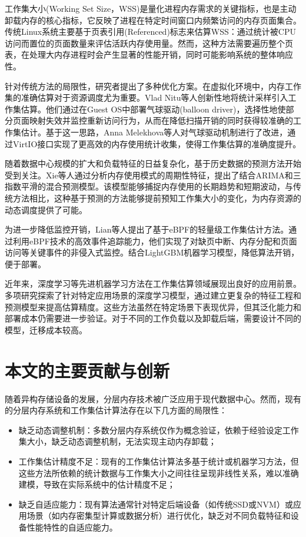 工作集大小(Working Set Size，WSS)是量化进程内存需求的关键指标，也是主动卸载内存的核心指标，它反映了进程在特定时间窗口内频繁访问的内存页面集合。传统Linux系统主要基于页表引用(Referenced)标志来估算WSS：通过统计被CPU访问而置位的页面数量来评估活跃内存使用量。然而，这种方法需要遍历整个页表，在处理大内存进程时会产生显著的性能开销，同时可能影响系统的整体响应性。

针对传统方法的局限性，研究者提出了多种优化方案。在虚拟化环境中，内存工作集的准确估算对于资源调度尤为重要。Vlad Nitu等人创新性地将统计采样引入工作集估算。他们通过在Guest OS中部署气球驱动(balloon driver)，选择性地使部分页面映射失效并监控重新访问行为，从而在降低扫描开销的同时获得较准确的工作集估计。基于这一思路，Anna Melekhova等人对气球驱动机制进行了改进，通过VirtIO接口实现了更高效的内存使用统计收集，使得工作集估算的准确度提升。

随着数据中心规模的扩大和负载特征的日益复杂化，基于历史数据的预测方法开始受到关注。Xie等人通过分析内存使用模式的周期性特征，提出了结合ARIMA和三指数平滑的混合预测模型。该模型能够捕捉内存使用的长期趋势和短期波动，与传统方法相比，这种基于预测的方法能够提前预知工作集大小的变化，为内存资源的动态调度提供了可能。

为进一步降低监控开销，Lian等人提出了基于eBPF的轻量级工作集估计方法。通过利用eBPF技术的高效事件追踪能力，他们实现了对缺页中断、内存分配和页面访问等关键事件的非侵入式监控。结合LightGBM机器学习模型，降低算法开销，便于部署。

近年来，深度学习等先进机器学习方法在工作集估算领域展现出良好的应用前景。多项研究探索了针对特定应用场景的深度学习模型，通过建立更复杂的特征工程和预测模型来提高估算精度。这些方法虽然在特定场景下表现优异，但其泛化能力和部署成本仍需要进一步验证。对于不同的工作负载以及卸载后端，需要设计不同的模型，迁移成本较高。


\section{本文的主要贡献与创新}

随着异构存储设备的发展，分层内存技术被广泛应用于现代数据中心。然而，现有的分层内存系统和工作集估计算法存在以下几方面的局限性：

\begin{itemize}
    \item 缺乏动态调整机制：多数分层内存系统仅作为概念验证，依赖于经验设定工作集大小，缺乏动态调整机制，无法实现主动内存卸载；
    
    \item 工作集估计精度不足：现有的工作集估计算法多基于统计或机器学习方法，但这些方法所依赖的统计数据与工作集大小之间往往呈现非线性关系，难以准确建模，导致在实际系统中的估计精度不足；
    
    \item 缺乏自适应能力：现有算法通常针对特定后端设备（如传统SSD或NVM）或应用场景（如内存密集型计算或数据分析）进行优化，缺乏对不同负载特征和设备性能特性的自适应能力。
\end{itemize}

